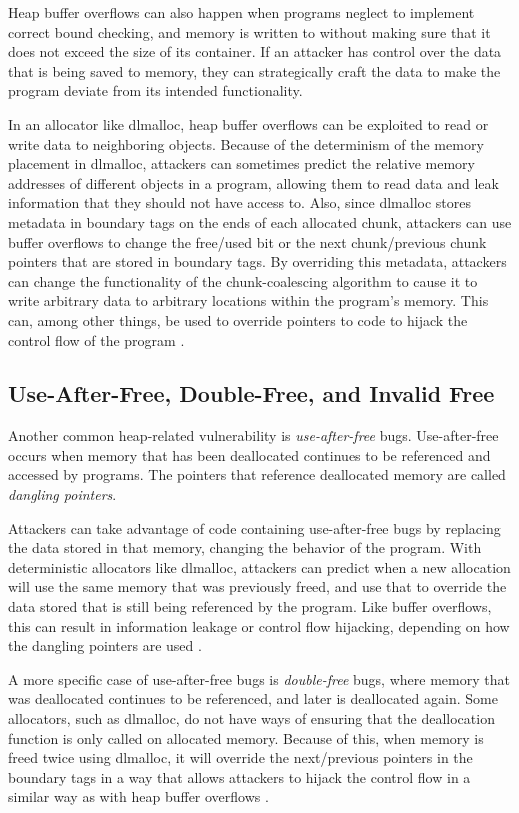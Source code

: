 \documentclass[conference]{IEEEtran}
\begin{document}
Heap buffer overflows can also happen when programs neglect to implement correct bound checking, and memory is written to without making sure that it does not exceed the size of its container.
If an attacker has control over the data that is being saved to memory, they can strategically craft the data to make the program deviate from its intended functionality.

In an allocator like dlmalloc, heap buffer overflows can be exploited to read or write data to neighboring objects.
Because of the determinism of the memory placement in dlmalloc, attackers can sometimes predict the relative memory addresses of different objects in a program, allowing them to read data and leak information that they should not have access to.
Also, since dlmalloc stores metadata in boundary tags on the ends of each allocated chunk, attackers can use buffer overflows to change the free/used bit or the next chunk/previous chunk pointers that are stored in boundary tags.
By overriding this metadata, attackers can change the functionality of the chunk-coalescing algorithm to cause it to write arbitrary data to arbitrary locations within the program's memory.
This can, among other things, be used to override pointers to code to hijack the control flow of the program \cite{security_mem_cpp}.

\subsection{Use-After-Free, Double-Free, and Invalid Free}

Another common heap-related vulnerability is \emph{use-after-free} bugs.
Use-after-free occurs when memory that has been deallocated continues to be referenced and accessed by programs.
The pointers that reference deallocated memory are called \emph{dangling pointers}.

Attackers can take advantage of code containing use-after-free bugs by replacing the data stored in that memory, changing the behavior of the program.
With deterministic allocators like dlmalloc, attackers can predict when a new allocation will use the same memory that was previously freed, and use that to override the data stored that is still being referenced by the program.
Like buffer overflows, this can result in information leakage or control flow hijacking, depending on how the dangling pointers are used \cite{freeguard}.

A more specific case of use-after-free bugs is \emph{double-free} bugs, where memory that was deallocated continues to be referenced, and later is deallocated again.
Some allocators, such as dlmalloc, do not have ways of ensuring that the deallocation function is only called on allocated memory.
Because of this, when memory is freed twice using dlmalloc, it will override the next/previous pointers in the boundary tags in a way that allows attackers to hijack the control flow in a similar way as with heap buffer overflows \cite{security_mem_cpp}.
\end{document}
